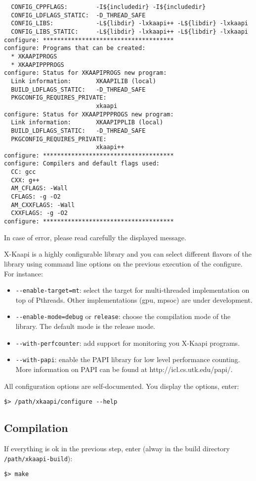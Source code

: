 \documentclass{article}
\newcommand{\kaapi}{\textsc{X}-Kaapi\xspace}
\begin{document}
\begin{verbatim}
  CONFIG_CPPFLAGS:        -I${includedir} -I${includedir}
  CONFIG_LDFLAGS_STATIC:  -D_THREAD_SAFE 
  CONFIG_LIBS:            -L${libdir} -lxkaapi++ -L${libdir} -lxkaapi
  CONFIG_LIBS_STATIC:     -L${libdir} -lxkaapi++ -L${libdir} -lxkaapi
configure: *************************************
configure: Programs that can be created: 
  * XKAAPIPROGS
  * XKAAPIPPPROGS
configure: Status for XKAAPIPROGS new program:
  Link information:       XKAAPILIB (local)
  BUILD_LDFLAGS_STATIC:   -D_THREAD_SAFE 
  PKGCONFIG_REQUIRES_PRIVATE:
                          xkaapi
configure: Status for XKAAPIPPPROGS new program:
  Link information:       XKAAPIPPLIB (local)
  BUILD_LDFLAGS_STATIC:   -D_THREAD_SAFE 
  PKGCONFIG_REQUIRES_PRIVATE:
                          xkaapi++
configure: *************************************
configure: Compilers and default flags used:
  CC: gcc
  CXX: g++
  AM_CFLAGS: -Wall
  CFLAGS: -g -O2
  AM_CXXFLAGS: -Wall
  CXXFLAGS: -g -O2
configure: *************************************
\end{verbatim}
\bigskip
In case of error, please read carefully the displayed message.

\bigskip
\kaapi is a highly configurable library and you can select different flavors of the library using command line options on the previous execution of the configure. For instance:
\begin{itemize}
\item \verb+--enable-target=mt+: select the target for multi-threaded implementation on top of Pthreads. Other implementations (gpu, mpsoc) are under development. 
\item \verb+--enable-mode=debug+ or \verb+release+: choose the compilation mode of the library. The default mode is the release mode.
\item \verb+--with-perfcounter+: add support for monitoring you \kaapi programs.	
\item \verb+--with-papi+: enable the PAPI library for low level performance counting. More information on PAPI can be found at http://icl.cs.utk.edu/papi/.
\end{itemize}

All configuration options are self-documented. You display the options, enter:
\begin{verbatim}
$> /path/xkaapi/configure --help
\end{verbatim}


\subsection{Compilation}
If everything is ok in the previous step, enter (alway in the build directory \verb+/path/xkaapi-build+):
\begin{verbatim}
$> make
\end{verbatim}
\end{document}
